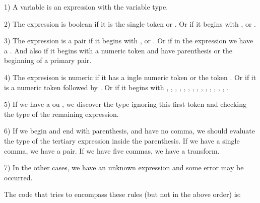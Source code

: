 {{{{{1) A variable is an expression with the variable type.

2) The expression is boolean if it is the single
 token  or . Or if it begins
 with ,  or
.

3) The expression is a pair if it begins
 with , 
 or . Or if in the expression we have
 a \monoespaco{[}. And also if it begins with a numeric token and have
 parenthesis or the beginning of a primary pair.

4) The expresison is numeric if it has a ingle numeric token or the
token . Or if it is a numeric token followed
by \monoespaco{/}. Or if it begins
with , , ,
,
, , , ,
, , , ,
, , .

5) If we have a \monoespaco{+} ou \monoespaco{-}, we discover the type
ignoring this first token and checking the type of the remaining
expression.

6) If we begin and end with parenthesis, and have no comma, we should
evaluate the type of the tertiary expression inside the
parenthesis. If we have a single comma, we have a pair. If we have
five commas, we have a transform.

7) In the other cases, we have an unknown expression and some error
may be occurred.

The code that tries to encompass these rules (but not in the above
order) is:

}}}}}

